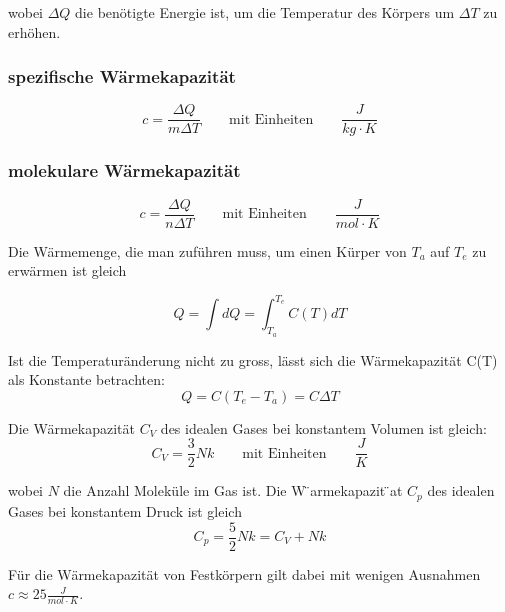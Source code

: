 \documentclass[11pt]{article}
\begin{document}
wobei $\Delta Q$ die ben{\"o}tigte Energie ist, um die Temperatur des K{\"o}rpers um $\Delta T$ zu erh{\"o}hen. \newline

\subsubsection{spezifische W{\"a}rmekapazit{\"a}t}
\begin{equation*}
	c = \frac{\Delta Q}{m \Delta T} \qquad\text{mit Einheiten}\qquad \frac{J}{kg \cdot K}
\end{equation*}

\subsubsection{molekulare W{\"a}rmekapazit{\"a}t}
\begin{equation*}
	c = \frac{\Delta Q}{n \Delta T} \qquad\text{mit Einheiten}\qquad \frac{J}{mol \cdot K}
\end{equation*}

Die W{\"a}rmemenge, die man zuf{\"u}hren muss, um einen K{\"u}rper von $T_a$ auf $T_e$ zu erw{\"a}rmen ist gleich

\begin{equation*}
	Q = \int dQ = \int _{T_a} ^{T_e} C(T) dT
\end{equation*}

Ist die Temperatur{\"a}nderung nicht zu gross, l{\"a}sst sich die W{\"a}rmekapazit{\"a}t C(T) als Konstante betrachten:
\begin{equation*}
	Q = C(T_e - T_a) = C \Delta T
\end{equation*}

Die W{\"a}rmekapazit{\"a}t $C_V$ des idealen Gases bei konstantem Volumen ist gleich:
\begin{equation*}
	C_V = \frac{3}{2}Nk \qquad\text{mit Einheiten}\qquad \frac{J}{K}
\end{equation*}

wobei $N$ die Anzahl Molek{\"u}le im Gas ist. Die W ̈armekapazit ̈at $C_p$ des idealen Gases bei konstantem Druck ist gleich
\begin{equation*}
	C_p = \frac{5}{2}Nk = C_V + Nk
\end{equation*}

F{\"u}r die W{\"a}rmekapazit{\"a}t von Festk{\"o}rpern gilt dabei mit wenigen Ausnahmen $c \approx 25 \frac{J}{mol \cdot K}$. \newline
\end{document}
